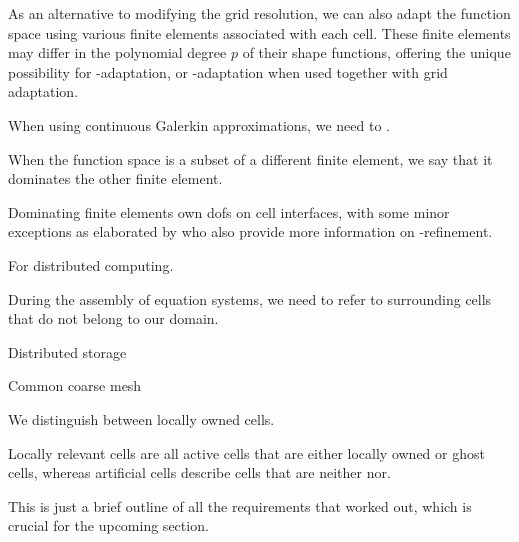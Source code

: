 As an alternative to modifying the grid resolution, we can also adapt the function space using various finite elements associated with each cell. These finite elements may differ in the polynomial degree $p$ of their shape functions, offering the unique possibility for \p-adaptation, or \hp-adaptation when used together with grid adaptation.

When using continuous Galerkin approximations, we need to .

When the function space is a subset of a different finite element, we say that it dominates the other finite element.

Dominating finite elements own \glspl{dof} on cell interfaces, with some minor exceptions as elaborated by \textcite{bangerth2009} who also provide more information on \hp-refinement.

For distributed computing.

During the assembly of equation systems, we need to refer to surrounding cells that do not belong to our domain.

Distributed storage

Common coarse mesh

We distinguish between locally owned cells.

Locally relevant cells are all active cells that are either locally owned or ghost cells, whereas artificial cells describe cells that are neither nor.

This is just a brief outline of all the requirements that \textcite{bangerth2012} worked out, which is crucial for the upcoming section.